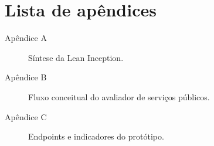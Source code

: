 \chapter*{Lista de apêndices}

\begin{description}
    \item[Apêndice A] Síntese da Lean Inception.
    \item[Apêndice B] Fluxo conceitual do avaliador de serviços públicos.
    \item[Apêndice C] Endpoints e indicadores do protótipo.
\end{description}

\cleardoublepage
